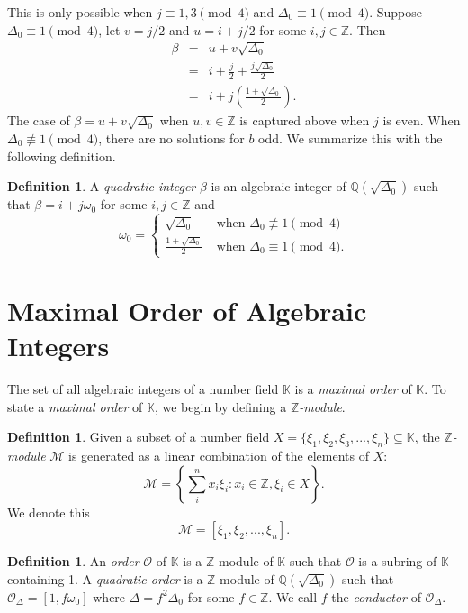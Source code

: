 \documentclass{ucalgthes1}
\theoremstyle{plain}
\theoremstyle{definition}
\newtheorem{defn}[thm]{Definition}
\newcommand{\KK}{\mathbb{K}}
\newcommand{\MM}{\mathcal{M}}
\newcommand{\OO}{\mathcal{O}}
\newcommand{\ZZ}{\mathbb{Z}}
\newcommand{\QQ}{\mathbb{Q}}
\begin{document}
\noindent
This is only possible when $j \equiv 1,3 \pmod 4$ and $\Delta_0 \equiv 1 \pmod 4$.  Suppose \break $\Delta_0 \equiv 1 \pmod 4$, let $v = j/2$ and $u = i + j/2$ for some $i, j \in \ZZ$.  Then
\begin{eqnarray*}
	\beta & = & u + v \sqrt{\Delta_0} \\
	& = & i + \frac{j}{2} + \frac{j \sqrt{\Delta_0}}{2} \\
	& = & i + j \left( \frac{1 + \sqrt{\Delta_0}}{2} \right).
\end{eqnarray*}
The case of $\beta = u + v \sqrt{\Delta_0}$ when $u,v \in \ZZ$ is captured above when $j$ is even. When $\Delta_0 \not \equiv 1 \pmod 4$, there are no solutions for $b$ odd.  We summarize this with the following definition.

\begin{defn}
\label{defn:quadraticInteger}
A \emph{quadratic integer} $\beta$ is an algebraic integer of $\QQ(\sqrt{\Delta_0})$ such that $\beta = i + j \omega_0$ for some $i,j \in \ZZ$ and
\[
	\omega_0 = \begin{cases}
		\sqrt{\Delta_0} & \textrm{ when } \Delta_0 \not \equiv 1 \pmod 4 \\
		\frac{1+\sqrt{\Delta_0}}{2} & \textrm{ when } \Delta_0 \equiv 1 \pmod 4.
	\end{cases}
\]
\end{defn}
\bigbreak


\bigbreak
\section{Maximal Order of Algebraic Integers}
The set of all algebraic integers of a number field $\KK$ is a \emph{maximal order} of $\KK$.  To state a \emph{maximal order} of $\KK$, we begin by defining a \emph{$\ZZ$-module}.  

\begin{defn}
Given a subset of a number field $X = \{ \xi_1, \xi_2, \xi_3, ..., \xi_n \} \subseteq \KK$, the \emph{$\ZZ$-module} $\MM$ is generated as a linear combination of the elements of $X$:
\[
	\MM = \left \{ \sum_{i}^n x_i \xi_i : x_i \in \ZZ, \xi_i \in X \right \}.
\]
We denote this
\[
	\MM = [ \xi_1, \xi_2, ..., \xi_n ].
\]
\end{defn}

\begin{defn}
An \emph{order} $\OO$ of $\KK$ is a $\ZZ$-module of $\KK$ such that $\OO$ is a subring of $\KK$ containing 1.  A \emph{quadratic order} is a $\ZZ$-module of $\QQ(\sqrt{\Delta_0})$ such that $\OO_\Delta = [1, f\omega_0]$ where $\Delta = f^2\Delta_0$ for some $f \in \ZZ$.  We call $f$ the \emph{conductor} of $\OO_\Delta$.
\end{defn}
\end{document}
